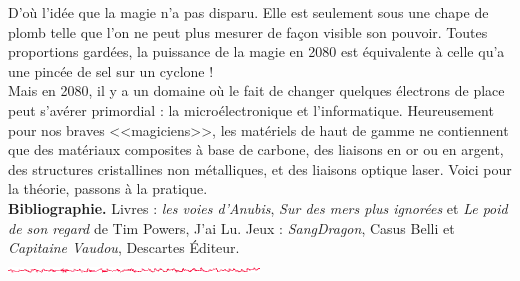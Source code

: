 \documentclass[11pt,twoside,a4paper]{article}
\def\barreCyberAgeHalf{\includegraphics[width=0.50\textwidth]{img/Filet_CA.png}}
\begin{document}
\begin{multicols}{2}
{	D'o{\`u} l'id{\'e}e que la magie n'a pas disparu. Elle est seulement sous une chape de plomb telle que l'on ne peut plus mesurer de fa\c{c}on visible son pouvoir. Toutes proportions gard{\'e}es, la puissance de la magie en 2080 est {\'e}quivalente {\`a} celle qu'a une pinc{\'e}e de sel sur un cyclone ! ~\\
	
	Mais en 2080, il y a un domaine o{\`u} le fait de changer quelques {\'e}lectrons de place peut s'av{\'e}rer primordial : la micro{\'e}lectronique et l'informatique. Heureusement pour nos braves <<magiciens>>, les mat{\'e}riels de haut de gamme ne contiennent que des mat{\'e}riaux composites {\`a} base de carbone, des liaisons en or ou en argent, des structures cristallines non m{\'e}talliques, et des liaisons optique laser. Voici pour la th{\'e}orie, passons {\`a} la pratique. ~\\
	
	\footnotesize{\textbf{Bibliographie. } Livres : \emph{les voies d'Anubis}, \emph{Sur des mers plus ignor{\'e}es} et \emph{Le poid de son regard} de Tim Powers, J'ai Lu. Jeux : \emph{SangDragon}, Casus Belli et \emph{Capitaine Vaudou}, Descartes {\'E}diteur. } ~\\
	
	\barreCyberAgeHalf ~\\
	
}
\end{multicols}
\end{document}
